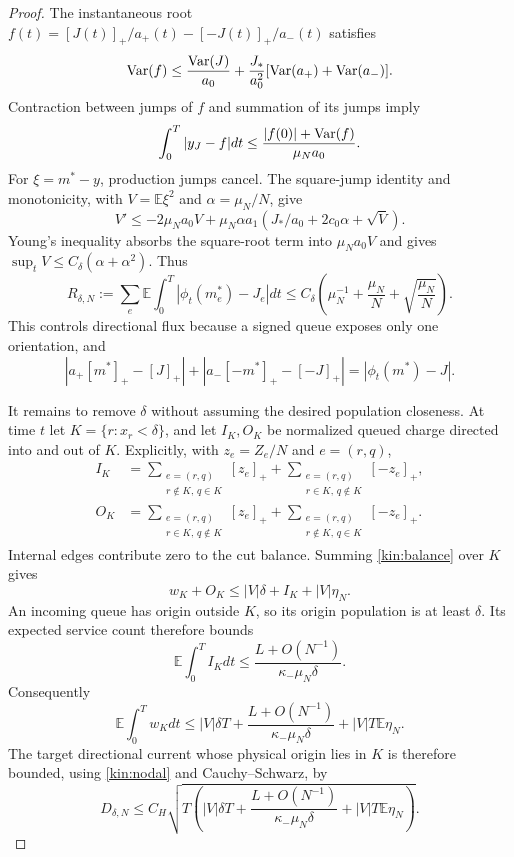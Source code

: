 \documentclass[11pt]{article}
\theoremstyle{definition}\newtheorem{definition}[theorem]{Definition}
\theoremstyle{remark}\newtheorem{remark}[theorem]{Remark}
\begin{document}
\begin{proof}
The instantaneous root
$f(t)=[J(t)]_+/a_+(t)-[-J(t)]_+/a_-(t)$ satisfies
\[
 \operatorname{Var}(f)\le \frac{\operatorname{Var}(J)}{a_0}
 +\frac{J_*}{a_0^2}[\operatorname{Var}(a_+)+\operatorname{Var}(a_-)].
\]
Contraction between jumps of $f$ and summation of its jumps imply
\[
 \int_0^T|y_J-f|dt\le\frac{|f(0)|+\operatorname{Var}(f)}{\mu_Na_0}.
\]
For $\xi=m^*-y$, production jumps cancel. The square-jump identity and
monotonicity, with $V=\mathbb E\xi^2$ and $\alpha=\mu_N/N$, give
\[
 V'\le-2\mu_Na_0V+
 \mu_N\alpha a_1(J_*/a_0+2c_0\alpha+\sqrt V).
\]
Young's inequality absorbs the square-root term into $\mu_Na_0V$ and
gives $\sup_tV\le C_\delta(\alpha+\alpha^2)$. Thus
\begin{equation}
 R_{\delta,N}:=\sum_e\mathbb E\int_0^T|\phi_t(m_e^*)-J_e|dt
 \le C_\delta\left(\mu_N^{-1}+\frac{\mu_N}{N}
 +\sqrt{\frac{\mu_N}{N}}\right).
 \label{kin:R}
\end{equation}
This controls directional flux because a signed queue exposes only one
orientation, and
\[
 |a_+[m^*]_+-[J]_+|+|a_-[-m^*]_+-[-J]_+|
 =|\phi_t(m^*)-J|.
\]

It remains to remove $\delta$ without assuming the desired population
closeness. At time $t$ let $K=\{r:x_r<\delta\}$, and let $I_K,O_K$ be
normalized queued charge directed into and out of $K$. Explicitly, with $z_e=Z_e/N$ and $e=(r,q)$,
\begin{align*}
 I_K&=\sum_{\substack{e=(r,q)\\r\notin K,\,q\in K}}[z_e]_+
       +\sum_{\substack{e=(r,q)\\r\in K,\,q\notin K}}[-z_e]_+,\\
 O_K&=\sum_{\substack{e=(r,q)\\r\in K,\,q\notin K}}[z_e]_+
       +\sum_{\substack{e=(r,q)\\r\notin K,\,q\in K}}[-z_e]_+.
\end{align*}
Internal edges contribute zero to the cut balance. Summing
\eqref{kin:balance} over $K$ gives
\[
 w_K+O_K\le |V|\delta+I_K+|V|\eta_N.
\]
An incoming queue has origin outside $K$, so its origin population is at
least $\delta$. Its expected service count therefore bounds
\[
 \mathbb E\int_0^TI_Kdt\le
 \frac{L+O(N^{-1})}{\kappa_-\mu_N\delta}.
\]
Consequently
\begin{equation}
 \mathbb E\int_0^Tw_Kdt\le |V|\delta T+
 \frac{L+O(N^{-1})}{\kappa_-\mu_N\delta}+|V|T\mathbb E\eta_N.
 \label{kin:smallmass}
\end{equation}
The target directional current whose physical origin lies in $K$ is
therefore bounded, using \eqref{kin:nodal} and Cauchy--Schwarz, by
\begin{equation}
 D_{\delta,N}\le C_H\sqrt{T\left(|V|\delta T+
 \frac{L+O(N^{-1})}{\kappa_-\mu_N\delta}+|V|T\mathbb E\eta_N\right)}.
 \label{kin:smallflux}
\end{equation}


\end{proof}
\end{document}
